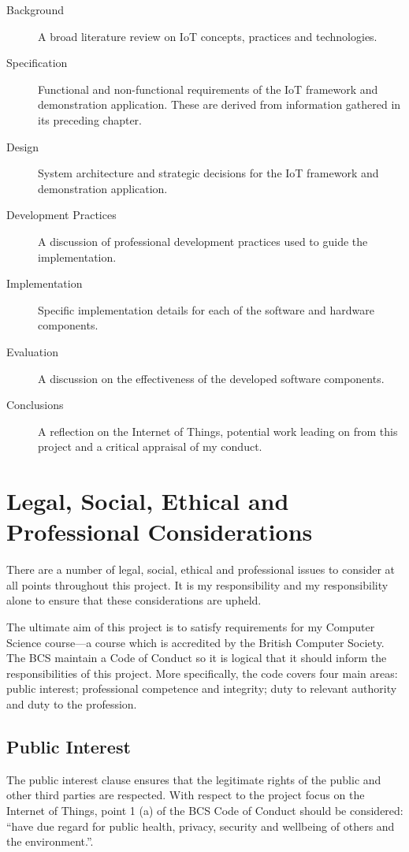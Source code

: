     \begin{description}
      \item[Background] A broad literature review on IoT concepts, practices and technologies.
      \item[Specification] Functional and non-functional requirements of the IoT framework and demonstration application. These are derived from information gathered in its preceding chapter.
      \item[Design] System architecture and strategic decisions for the IoT framework and demonstration application.
      \item[Development Practices] A discussion of professional development practices used to guide the implementation.
      \item[Implementation] Specific implementation details for each of the software and hardware components.
      \item[Evaluation] A discussion on the effectiveness of the developed software components.
      \item[Conclusions] A reflection on the Internet of Things, potential work leading on from this project and a critical appraisal of my conduct.

    \end{description}

  \section{Legal, Social, Ethical and Professional Considerations}
  \label{chapter:profession-considerations}
    There are a number of legal, social, ethical and professional issues to consider at all points throughout this project. It is my responsibility and my responsibility alone to ensure that these considerations are upheld.

    The ultimate aim of this project is to satisfy requirements for my Computer Science course---a course which is accredited by the British Computer Society. The BCS maintain a Code of Conduct \citep{bcs-coc} so it is logical that it should inform the responsibilities of this project. More specifically, the code covers four main areas: public interest; professional competence and integrity; duty to relevant authority and duty to the profession.

    \subsection{Public Interest}
      The public interest clause ensures that the legitimate rights of the public and other third parties are respected. With respect to the project focus on the Internet of Things, point 1 (a) of the BCS Code of Conduct should be considered: ``have due regard for public health, privacy, security and wellbeing of others and the environment.''.

